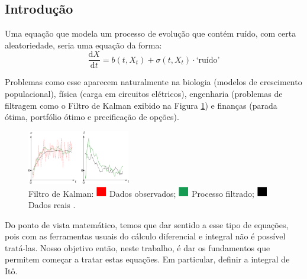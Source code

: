 \documentclass[portrait]{a0poster}	%
\theoremstyle{definition}
\newcommand\crule[3][black]{\textcolor{#1}{\rule{#2}{#3}}}
\begin{document}
\begin{multicols}{2}

    
    \section*{Introdução}

    Uma equação que modela um processo de evolução que contém ruído, com certa aleatoriedade, seria uma equação da forma:
    \begin{equation}\label{eq:sde}
        \frac{\mathrm{d}X}{\mathrm{d}t} = b(t,X_t) + \sigma(t,X_t)\cdot \text{`ruído'}
    \end{equation}

    Problemas como esse aparecem naturalmente na biologia (modelos de crescimento populacional), física (carga em circuitos elétricos), engenharia (problemas de filtragem como o Filtro de Kalman exibido na Figura \ref{fig:kalman}) e finanças (parada ótima, portfólio ótimo e precificação de opções). 

    \begin{figure}[H]
    \centering
        \includegraphics[width=0.4\textwidth]{Kalman.png} 
        \caption{Filtro de Kalman: $\crule[red]{0.4cm}{0.4cm}$ Dados observados; $\crule[ForestGreen]{0.4cm}{0.4cm}$ Processo filtrado; $\crule{0.4cm}{0.4cm}$ Dados reais \cite{wiki:Kalman_filter}.}
        \label{fig:kalman}
    \end{figure}

    Do ponto de vista matemático, temos que dar sentido a esse tipo de equações, pois com as ferramentas usuais do cálculo diferencial e integral não é possível tratá-las. Nosso objetivo então, neste trabalho, é dar os fundamentos que permitem começar a tratar estas equações. Em particular, definir a integral de Itô.


\end{multicols}
\end{document}
